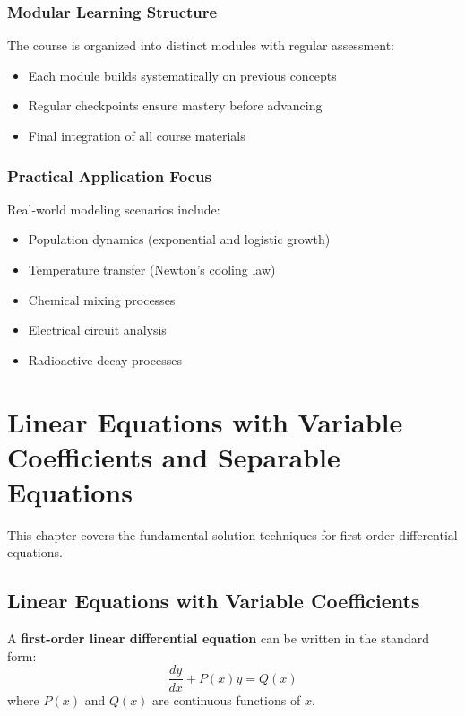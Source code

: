 \documentclass[12pt, letterpaper]{book}
\begin{document}
\subsection{Modular Learning Structure}
The course is organized into distinct modules with regular assessment:
\begin{itemize}
    \item Each module builds systematically on previous concepts
    \item Regular checkpoints ensure mastery before advancing
    \item Final integration of all course materials
\end{itemize}

\subsection{Practical Application Focus}
Real-world modeling scenarios include:
\begin{itemize}
    \item Population dynamics (exponential and logistic growth)
    \item Temperature transfer (Newton's cooling law)
    \item Chemical mixing processes
    \item Electrical circuit analysis
    \item Radioactive decay processes
\end{itemize}

\chapter{Linear Equations with Variable Coefficients and Separable Equations}
\label{chap:session_2}

This chapter covers the fundamental solution techniques for first-order differential equations.

\section{Linear Equations with Variable Coefficients}
A \textbf{first-order linear differential equation} can be written in the standard form:
\begin{equation*}
    \frac{dy}{dx} + P(x)y = Q(x)
\end{equation*}
where $P(x)$ and $Q(x)$ are continuous functions of $x$.
\end{document}
